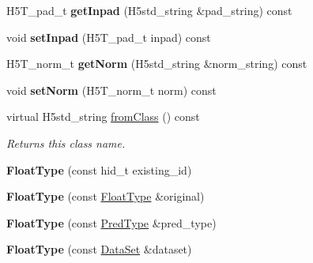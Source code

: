 \begin{DoxyCompactItemize}
\mbox{\label{class_h5_1_1_float_type_ad4d8570bb0ec01427c3fe51e2ebdcaea}} 
H5\+T\+\_\+pad\+\_\+t {\bfseries get\+Inpad} (H5std\+\_\+string \&pad\+\_\+string) const
\item 
\mbox{\label{class_h5_1_1_float_type_ae2ad7a8db9674b6e257c7ac2ca247125}} 
void {\bfseries set\+Inpad} (H5\+T\+\_\+pad\+\_\+t inpad) const
\item 
\mbox{\label{class_h5_1_1_float_type_a3a288b2690a2cfafa01343f44184f680}} 
H5\+T\+\_\+norm\+\_\+t {\bfseries get\+Norm} (H5std\+\_\+string \&norm\+\_\+string) const
\item 
\mbox{\label{class_h5_1_1_float_type_a95e74b13cee057ad3cf6b500fbb96059}} 
void {\bfseries set\+Norm} (H5\+T\+\_\+norm\+\_\+t norm) const
\item 
\mbox{\label{class_h5_1_1_float_type_a5977cef7ad7a91fa7b922672cab515f7}} 
virtual H5std\+\_\+string \hyperlink{class_h5_1_1_float_type_a5977cef7ad7a91fa7b922672cab515f7}{from\+Class} () const
\begin{DoxyCompactList}\small\item\em Returns this class name. \end{DoxyCompactList}\item 
\mbox{\label{class_h5_1_1_float_type_a786d4ff293ea19bb39b3f35c29f321e2}} 
{\bfseries Float\+Type} (const hid\+\_\+t existing\+\_\+id)
\item 
\mbox{\label{class_h5_1_1_float_type_a422f60673e35a4044afb7b4f2cabf204}} 
{\bfseries Float\+Type} (const \hyperlink{class_h5_1_1_float_type}{Float\+Type} \&original)
\item 
\mbox{\label{class_h5_1_1_float_type_ac815e325b21b3a3d3e829d88c8bc7786}} 
{\bfseries Float\+Type} (const \hyperlink{class_h5_1_1_pred_type}{Pred\+Type} \&pred\+\_\+type)
\item 
\mbox{\label{class_h5_1_1_float_type_a8ca1abd3d0eb51095524d5cc4e23766e}} 
{\bfseries Float\+Type} (const \hyperlink{class_h5_1_1_data_set}{Data\+Set} \&dataset)

\end{DoxyCompactItemize}
